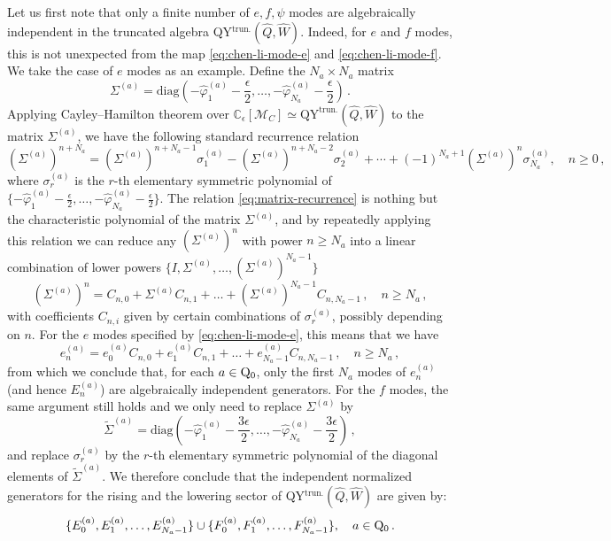 \documentclass[12pt,a4paper]{article}
\newcommand{\eps}{\epsilon}
\begin{document}
Let us first note that only a finite number of $e,f,\psi$ modes are algebraically independent in the truncated algebra QY$^{\text{trun.}}(\hat{Q},\hat W)$. 
Indeed, for $e$ and $f$ modes, this is not unexpected from the map \eqref{eq:chen-li-mode-e} and \eqref{eq:chen-li-mode-f}. We take the case of $e$ modes as an example. Define the $N_a\times N_a$ matrix
\begin{equation}
    \Sigma^{(a)}=\mathrm{diag} (-\hat{\varphi}^{(a)}_1-\frac{\eps}{2},\dots,-\hat{\varphi}^{(a)}_{N_a}-\frac{\eps}{2})\,.
\end{equation}
Applying Cayley–Hamilton theorem over $\mathbb C_\eps[\mathcal M_C]\simeq\text{QY}^{\text{trun.}}(\hat{Q},\hat W)$ to the matrix $\Sigma^{(a)}$, we have the following standard recurrence relation
\begin{equation}
 (\Sigma^{(a)})^{n+N_a}=
(\Sigma^{(a)})^{n+N_a-1}\sigma_1^{(a)}-
 (\Sigma^{(a)})^{n+N_a-2}\sigma_2^{(a)}+\cdots+
 (-1)^{N_a+1}(\Sigma^{(a)})^n\sigma_{N_a}^{(a)},\quad n\geq 0\,,
 \label{eq:matrix-recurrence}
\end{equation}
where $\sigma^{(a)}_r$ is the $r$-th elementary symmetric polynomial of $\{-\hat{\varphi}^{(a)}_1-\frac{\eps}{2},\dots,-\hat{\varphi}^{(a)}_{N_a}-\frac{\eps}{2}\}$. 
The relation \eqref{eq:matrix-recurrence} is nothing but the characteristic polynomial of the matrix $\Sigma^{(a)}$, and by repeatedly applying this relation we can reduce any $(\Sigma^{(a)})^n$ with power $n\geq N_a$ into a linear combination of lower powers $\{I,\Sigma^{(a)},\dots,(\Sigma^{(a)})^{N_a-1}\}$
\begin{equation}
    (\Sigma^{(a)})^n=C_{n,0} +\Sigma^{(a)} C_{n,1} +\dots+  (\Sigma^{(a)})^{N_a-1}C_{n,N_a-1}\,, \quad n\geq N_a\,,
\end{equation}
with coefficients $C_{n,i}$ given by certain combinations of $\sigma^{(a)}_r$, possibly depending on $n$. 
For the $e$ modes specified by  \eqref{eq:chen-li-mode-e}, this means that we have
\begin{equation}
    e^{(a)}_n=e^{(a)}_0 C_{n,0} +e^{(a)}_1C_{n,1} +\dots+ e^{(a)}_{N_a-1}C_{n,N_a-1}\,,\quad n\geq N_a\,,
\end{equation}
from which we conclude that, for each $a\in \rm Q_0$, only the first $N_a$ modes of $e^{(a)}_n$ (and hence $E^{(a)}_n$) are algebraically independent generators. For the $f$ modes, the same argument still holds and we only need to replace $\Sigma^{(a)}$ by 
\begin{equation}
    \tilde{\Sigma}^{(a)}=\text{diag}(-\hat{\varphi}^{(a)}_1-\frac{3\eps}{2},\dots,-\hat{\varphi}^{(a)}_{N_a}-\frac{3\eps}{2})\,,
\end{equation}
and replace $\sigma^{(a)}_r$ by the $r$-th elementary symmetric polynomial of the diagonal elements of $\tilde{\Sigma}^{(a)}$. 
We therefore conclude that the independent normalized generators for the rising and the lowering sector of 
QY$^{\text{trun.}}(\hat{Q},\hat W)$ are given by:
\begin{equation}
    \{E^{(a)}_0,E^{(a)}_1,\dots,E^{(a)}_{N_a-1}\}\cup \{F^{(a)}_0,F^{(a)}_1,\dots,F^{(a)}_{N_a-1}\},\quad a\in\rm Q_0\,.
\end{equation}
\end{document}
